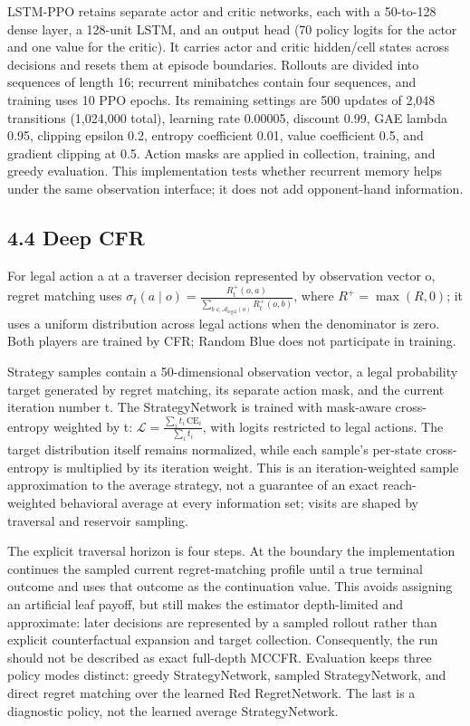\documentclass[11pt]{article}
\begin{document}
LSTM-PPO retains separate actor and critic networks, each with a 50-to-128 dense layer, a 128-unit LSTM, and an output head (70 policy logits for the actor and one value for the critic). It carries actor and critic hidden/cell states across decisions and resets them at episode boundaries. Rollouts are divided into sequences of length 16; recurrent minibatches contain four sequences, and training uses 10 PPO epochs. Its remaining settings are 500 updates of 2,048 transitions (1,024,000 total), learning rate 0.00005, discount 0.99, GAE lambda 0.95, clipping epsilon 0.2, entropy coefficient 0.01, value coefficient 0.5, and gradient clipping at 0.5. Action masks are applied in collection, training, and greedy evaluation. This implementation tests whether recurrent memory helps under the same observation interface; it does not add opponent-hand information.

\subsection*{4.4 Deep CFR}

For legal action a at a traverser decision represented by observation vector o, regret matching uses $\sigma_t(a\mid o) = \frac{R_t^+(o,a)}{\sum_{b\in\mathcal{A}_{\mathrm{legal}}(o)} R_t^+(o,b)}$, where $R^+ = \max(R,0)$; it uses a uniform distribution across legal actions when the denominator is zero. Both players are trained by CFR; Random Blue does not participate in training.

Strategy samples contain a 50-dimensional observation vector, a legal probability target generated by regret matching, its separate action mask, and the current iteration number t. The StrategyNetwork is trained with mask-aware cross-entropy weighted by t: $\mathcal{L} = \frac{\sum_i t_i\,\mathrm{CE}_i}{\sum_i t_i}$, with logits restricted to legal actions. The target distribution itself remains normalized, while each sample's per-state cross-entropy is multiplied by its iteration weight. This is an iteration-weighted sample approximation to the average strategy, not a guarantee of an exact reach-weighted behavioral average at every information set; visits are shaped by traversal and reservoir sampling.

The explicit traversal horizon is four steps. At the boundary the implementation continues the sampled current regret-matching profile until a true terminal outcome and uses that outcome as the continuation value. This avoids assigning an artificial leaf payoff, but still makes the estimator depth-limited and approximate: later decisions are represented by a sampled rollout rather than explicit counterfactual expansion and target collection. Consequently, the run should not be described as exact full-depth MCCFR. Evaluation keeps three policy modes distinct: greedy StrategyNetwork, sampled StrategyNetwork, and direct regret matching over the learned Red RegretNetwork. The last is a diagnostic policy, not the learned average StrategyNetwork.
\end{document}
